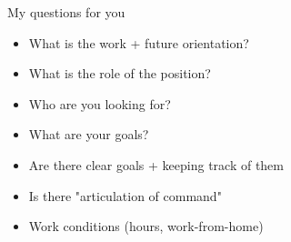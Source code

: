 \begin{frame}{My questions for you}

  \begin{itemize}
    \item What is the work + future orientation?
    \item What is the role of the position?
    \item Who are you looking for?
    \item What are your goals?
    \item Are there clear goals + keeping track of them
    \item Is there "articulation of command"
    \item Work conditions (hours, work-from-home)
  \end{itemize}

\end{frame}
